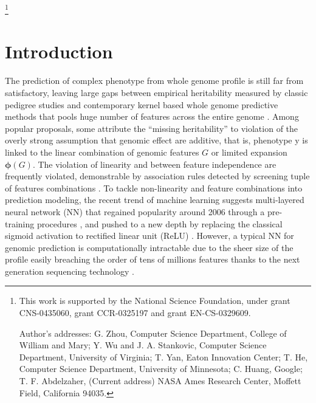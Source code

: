 \documentclass[acmtog, authorversion]{acmart}
\begin{document}
%
%




\thanks{This work is supported by the National Science Foundation,
  under grant CNS-0435060, grant CCR-0325197 and grant EN-CS-0329609.

  Author's addresses: G. Zhou, Computer Science Department, College of
  William and Mary; Y. Wu {and} J. A. Stankovic, Computer Science
  Department, University of Virginia; T. Yan, Eaton Innovation Center;
  T. He, Computer Science Department, University of Minnesota; C.
  Huang, Google; T. F. Abdelzaher, (Current address) NASA Ames
  Research Center, Moffett Field, California 94035.}


\maketitle

\newcommand{\bs}[1]{\boldsymbol{#1}}
\section{Introduction}
The prediction of complex phenotype from whole genome profile is still far from satisfactory, leaving large gaps between empirical heritability measured by classic pedigree studies and contemporary kernel based whole genome predictive methods that pools huge number of features across the entire genome \cite{WGP:Gustavo, WGP:Zhang, GCTA, WGP:GMatrix1, WGP:Review1}. Among popular proposals, some attribute the ``missing heritability'' to violation of the overly strong assumption that genomic effect are additive, that is, phenotype y is linked to the linear combination of genomic features $G$ or limited expansion $\bs{\phi}(G)$. The violation of linearity and between feature independence are frequently violated, demonstrable by association rules detected by screening tuple of features combinations \cite{GWA:GMDR, GWA:MDR}. To tackle non-linearity and feature combinations into prediction modeling, the recent trend of machine learning suggests multi-layered neural network (NN) that regained popularity around 2006 through a pre-training procedures \cite{DL:Intro1}, and pushed to a new depth by replacing the classical sigmoid activation to rectified linear unit (ReLU) \cite{DL:Relu1}. However, a typical NN for genomic prediction is computationally intractable due to the sheer size of the profile easily breaching the order of tens of millions features thanks to the next generation sequencing technology \cite{NGS1}.
\end{document}
